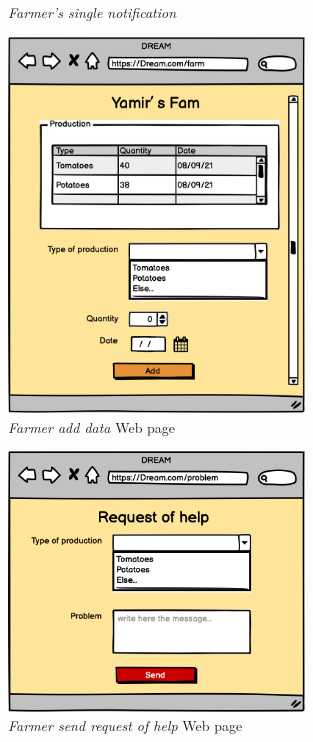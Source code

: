 \begin{figure}[ht!]
\begin{minipage}{0.47\textwidth}
        \caption{\emph{Farmer's single notification}}
        \label{fig:singleNotification}
    \end{minipage}
\end{figure}

\begin{figure}[H]
    \begin{center}
    \includegraphics[width=0.7\textwidth]{mockups/FAddData.png}
    \caption{\emph{Farmer add data} Web page}
    \label{fig:addData}
    \end{center}
\end{figure}

\begin{figure}[H]
    \begin{center}
    \includegraphics[width=0.7\textwidth]{mockups/Help.png}
    \caption{\emph{Farmer send request of help} Web page}
    \label{fig:helpRequest}
    \end{center}
\end{figure}

